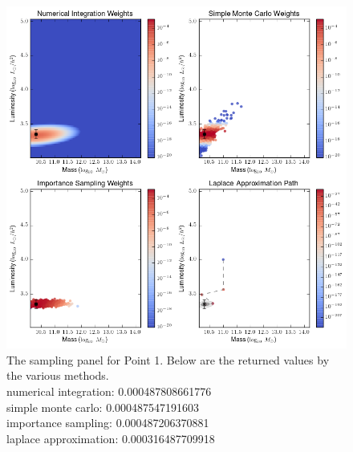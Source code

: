 \documentclass[\docopts]{\docclass}
\begin{document}
\begin{figure}[!h]
\centering
\includegraphics[width=0.9\columnwidth]{point2.png}
\caption{
The sampling panel for Point 1. Below are the returned values by the various methods.\\
numerical integration: 0.000487808661776\\
simple monte carlo: 0.000487547191603\\
importance sampling: 0.000487206370881\\
laplace approximation: 0.000316487709918\\
\label{fig:point2}}
\end{figure}
\end{document}
